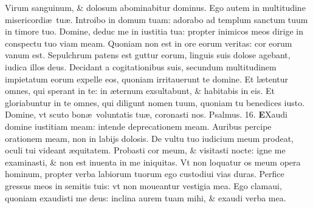 \documentclass[a5paper,10pt]{book}
\def\ae{æ}
\begin{document}
\begin{multicols*}{2}
\newline \color{red} V\color{black}irum sanguinum, \& dolosum abominabitur dominus.
\newline \color{red} E\color{black}go autem in multitudine misericordi\ae \ tu\ae .
\newline \color{red} I\color{black}ntroibo in domum tuam: adorabo ad templum sanctum tuum in timore tuo.
\newline \color{red} D\color{black}omine, deduc me in iustitia tua: propter inimicos meos dirige in conspectu tuo viam meam.
\newline \color{red} Q\color{black}uoniam non est in ore eorum veritas: cor eorum vanum est.
\newline \color{red} S\color{black}epulchrum patens est guttur eorum, linguis suis dolose agebant, iudica illos deus.
\newline \color{red} D\color{black}ecidant a cogitationibus suis, secundum multitudinem impietatum eorum expelle eos, quoniam irritauerunt te domine.
\newline \color{red} E\color{black}t l\ae tentur omnes, qui sperant in te: in \ae ternum exsultabunt, \& habitabis in eis.
\newline \color{red} E\color{black}t gloriabuntur in te omnes, qui diligunt nomen tuum, quoniam tu benedices iusto.
\newline \color{red} D\color{black}omine, vt scuto bon\ae \ voluntatis tu\ae , coronasti nos. \quad \color{red} Psalmus. 16.\color{black}
\vspace{-1em}
\lettrine[lines=2]{\bfseries \color{red} E}{}Xaudi domine iustitiam meam: intende deprecationem meam.
\newline \color{red} A\color{black}uribus percipe orationem meam, non in labijs dolosis.
\newline \color{red} D\color{black}e vultu tuo iudicium meum prodeat, oculi tui videant \ae quitatem.%
\newline \color{red} P\color{black}robasti cor meum, \& visitasti nocte: igne me examinasti, \& non est inuenta in me iniquitas.
\newline \color{red} V\color{black}t non loquatur os meum opera hominum, propter verba labiorum tuorum ego custodiui vias duras.
\newline \color{red} P\color{black}erfice gressus meos in semitis tuis: vt non moueantur vestigia mea.
\newline \color{red} E\color{black}go clamaui, quoniam exaudisti me deus: inclina aurem tuam mihi, \& exaudi verba mea.

\end{multicols*}
\end{document}
